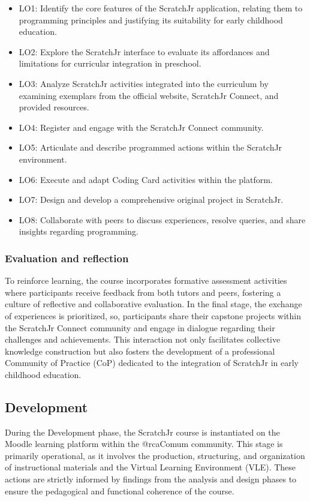 \documentclass[english]{textolivre}
\begin{document}
\begin{itemize}
    \item LO1: Identify the core features of the ScratchJr application, relating them to programming principles and justifying its suitability for early childhood education.
    \item LO2: Explore the ScratchJr interface to evaluate its affordances and limitations for curricular integration in preschool.
    \item LO3: Analyze ScratchJr activities integrated into the curriculum by examining exemplars from the official website, ScratchJr Connect, and provided resources.
    \item LO4: Register and engage with the ScratchJr Connect community.
    \item LO5: Articulate and describe programmed actions within the ScratchJr environment.
    \item LO6: Execute and adapt Coding Card activities within the platform.
    \item LO7: Design and develop a comprehensive original project in ScratchJr.
    \item LO8: Collaborate with peers to discuss experiences, resolve queries, and share insights regarding programming.
\end{itemize}


\subsubsection{Evaluation and reflection}\label{sec-listas}
To reinforce learning, the course incorporates formative assessment activities where participants receive feedback from both tutors and peers, fostering a culture of reflective and collaborative evaluation. In the final stage, the exchange of experiences is prioritized, so, participants share their capstone projects within the ScratchJr Connect community and engage in dialogue regarding their challenges and achievements. This interaction not only facilitates collective knowledge construction but also fosters the development of a professional Community of Practice (CoP) dedicated to the integration of ScratchJr in early childhood education.



\subsection{Development}\label{sec-figuras-tabelas}
During the Development phase, the ScratchJr course is instantiated on the Moodle learning platform within the @rcaComum community. This stage is primarily operational, as it involves the production, structuring, and organization of instructional materials and the Virtual Learning Environment (VLE). These actions are strictly informed by findings from the analysis and design phases to ensure the pedagogical and functional coherence of the course.
\end{document}
